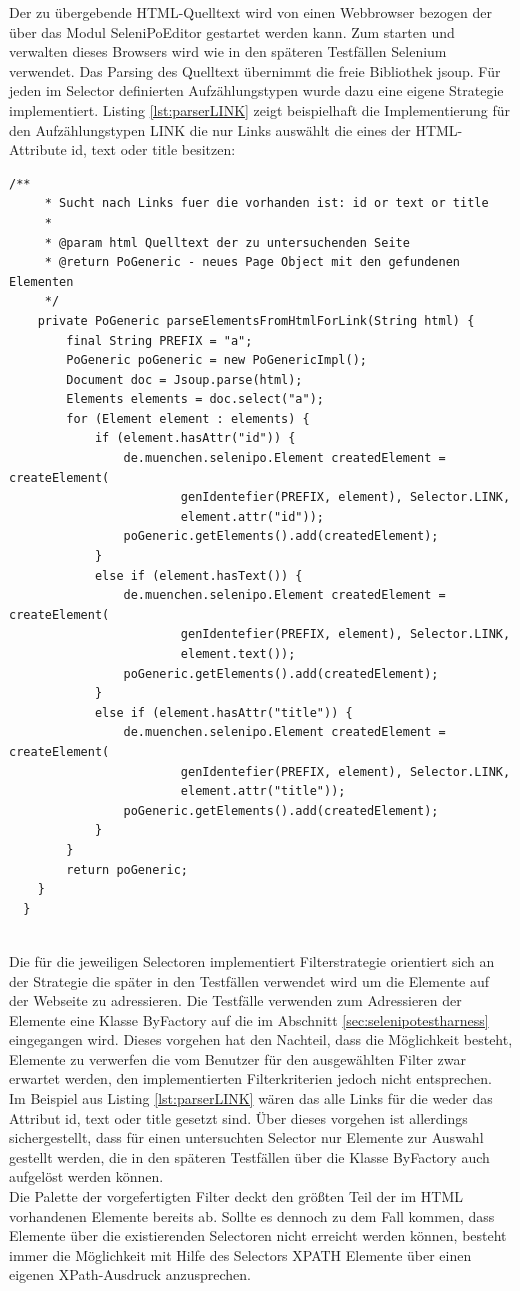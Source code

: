 Der zu übergebende HTML-Quelltext wird von einen Webbrowser bezogen der über das Modul SeleniPoEditor gestartet werden kann. Zum starten und verwalten dieses Browsers wird wie in den späteren Testfällen Selenium verwendet.
Das Parsing des Quelltext übernimmt die freie Bibliothek jsoup.
Für jeden im Selector definierten Aufzählungstypen wurde dazu eine eigene Strategie implementiert.
Listing \ref{lst:parserLINK} zeigt beispielhaft die Implementierung für den Aufzählungstypen LINK die nur Links auswählt die eines der HTML-Attribute id, text oder title besitzen:
\begin{lstlisting}[caption={Parser für den Aufzählungstypen LINK},label={lst:parserLINK}]
 	/**
	 * Sucht nach Links fuer die vorhanden ist: id or text or title
	 *
	 * @param html Quelltext der zu untersuchenden Seite
	 * @return PoGeneric - neues Page Object mit den gefundenen Elementen
	 */
	private PoGeneric parseElementsFromHtmlForLink(String html) {
		final String PREFIX = "a";
		PoGeneric poGeneric = new PoGenericImpl();
		Document doc = Jsoup.parse(html);
		Elements elements = doc.select("a");
		for (Element element : elements) {
			if (element.hasAttr("id")) {
				de.muenchen.selenipo.Element createdElement = createElement(
						genIdentefier(PREFIX, element), Selector.LINK,
						element.attr("id"));
				poGeneric.getElements().add(createdElement);
			}
			else if (element.hasText()) {
				de.muenchen.selenipo.Element createdElement = createElement(
						genIdentefier(PREFIX, element), Selector.LINK,
						element.text());
				poGeneric.getElements().add(createdElement);
			}
			else if (element.hasAttr("title")) {
				de.muenchen.selenipo.Element createdElement = createElement(
						genIdentefier(PREFIX, element), Selector.LINK,
						element.attr("title"));
				poGeneric.getElements().add(createdElement);
			}
		}
		return poGeneric;
	}
  }
  
\end{lstlisting} 

Die für die jeweiligen Selectoren implementiert Filterstrategie orientiert sich an der Strategie die später in den Testfällen verwendet wird um die Elemente auf der Webseite zu adressieren. Die Testfälle verwenden zum Adressieren der Elemente eine Klasse ByFactory auf die im Abschnitt \ref{sec:selenipotestharness} eingegangen wird.
Dieses vorgehen hat den Nachteil, dass die Möglichkeit besteht, Elemente zu verwerfen die vom Benutzer für den ausgewählten Filter zwar erwartet werden, den implementierten Filterkriterien jedoch nicht entsprechen.
Im Beispiel aus Listing \ref{lst:parserLINK} wären das alle Links für die weder das Attribut id, text oder title gesetzt sind.
Über dieses vorgehen ist allerdings sichergestellt, dass für einen untersuchten Selector nur Elemente zur Auswahl gestellt werden, die in den späteren Testfällen über die Klasse ByFactory auch aufgelöst werden können.\\
Die Palette der vorgefertigten Filter deckt den größten Teil der im HTML vorhandenen Elemente bereits ab. Sollte es dennoch zu dem Fall kommen, dass Elemente über die existierenden Selectoren nicht erreicht werden können, besteht immer die Möglichkeit mit Hilfe des Selectors XPATH Elemente über einen eigenen XPath-Ausdruck anzusprechen.


